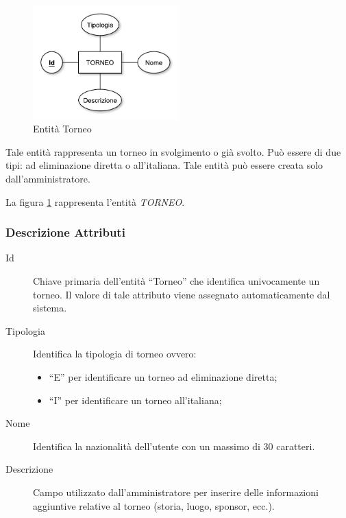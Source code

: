 		\begin{figure}[h]
			\centering
			\includegraphics[width=0.5\textwidth]
			{immagini/06-torneo}
			
			\caption{Entità Torneo}
			\label{entita-torneo}
		\end{figure}
		
		Tale entità rappresenta un torneo in svolgimento o già svolto. Può essere di due tipi: ad eliminazione diretta o all'italiana. Tale entità può essere creata solo dall'amministratore.
		
		La figura \ref{entita-torneo} rappresenta l'entità \emph{TORNEO}.
		
		\subsubsection*{Descrizione Attributi}
		
		\begin{description}
			
			\item[Id]
			Chiave primaria dell'entità ``Torneo'' che identifica univocamente un torneo. Il valore di tale attributo viene assegnato automaticamente dal sistema.
			
			\item[Tipologia]
			Identifica la tipologia di torneo ovvero:
			\begin{itemize}
				\item
				``E'' per identificare un torneo ad eliminazione diretta;
				\item
				``I'' per identificare un torneo all'italiana;
			\end{itemize}
			
			\item[Nome]
			Identifica la nazionalità dell'utente con un massimo di 30 caratteri.
			
			\item[Descrizione]
			Campo utilizzato dall'amministratore per inserire delle informazioni aggiuntive relative al torneo (storia, luogo, sponsor, ecc.).
			
		\end{description}
		
